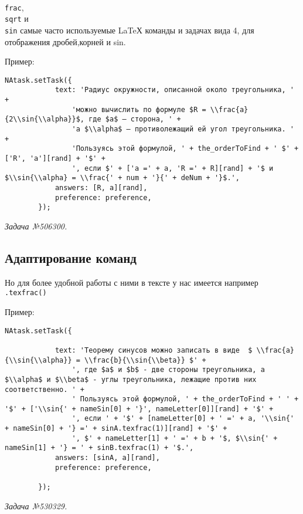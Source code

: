 \texttt{\\frac{}{}}, \texttt{\\sqrt{}} и \texttt{\\sin{}} 
самые часто используемые LaTeХ команды и задачах вида 4, для отображения дробей,корней и sin.

Пример:
\begin{lstlisting}
NAtask.setTask({
			text: 'Радиус окружности, описанной около треугольника, ' +
				'можно вычислить по формуле $R = \\frac{a}{2\\sin{\\alpha}}$, где $a$ – сторона, ' +
				'а $\\alpha$ – противолежащий ей угол треугольника. ' +
				'Пользуясь этой формулой, ' + the_orderToFind + ' $' + ['R', 'a'][rand] + '$' +
				', если $' + ['a =' + a, 'R =' + R][rand] + '$ и $\\sin{\\alpha} = \\frac{' + num + '}{' + deNum + '}$.',
			answers: [R, a][rand],
			preference: preference,
		});
\end{lstlisting}
\textsl{Задача №506300.}

\subsection{Адаптирование команд}
Но для более удобной работы с ними в тексте у нас имеется например \texttt{.texfrac()} %

Пример:
\begin{lstlisting}
NAtask.setTask({

			text: 'Теорему синусов можно записать в виде  $ \\frac{a}{\\sin{\\alpha}} = \\frac{b}{\\sin{\\beta}} $' +
				', где $a$ и $b$ - две стороны треугольника, а $\\alpha$ и $\\beta$ - углы треугольника, лежащие против них соответственно. ' +
				' Пользуясь этой формулой, ' + the_orderToFind + ' ' + '$' + ['\\sin{' + nameSin[0] + '}', nameLetter[0]][rand] + '$' +
				', если ' + '$' + [nameLetter[0] + ' =' + a, '\\sin{' + nameSin[0] + '} =' + sinA.texfrac(1)][rand] + '$' +
				', $' + nameLetter[1] + ' =' + b + '$, $\\sin{' + nameSin[1] + '} = ' + sinB.texfrac(1) + '$.',
			answers: [sinA, a][rand],
			preference: preference,

		});
\end{lstlisting}
\textsl{Задача №530329.}

